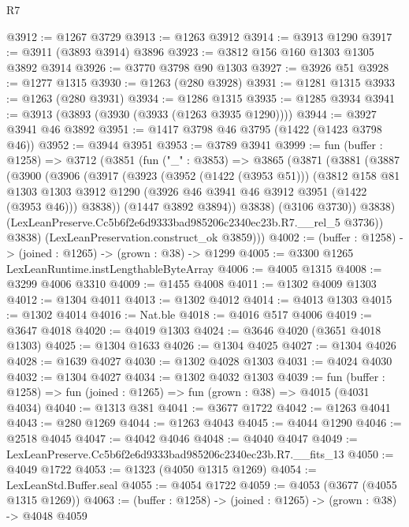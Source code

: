 \begin{lexlean}{R7}
\begin{coremodule}
@3912 := @1267 @3729
@3913 := @1263 @3912
@3914 := @3913 @1290
@3917 := @3911 (@3893 @3914) @3896
@3923 := @3812 @156 @160 @1303 @1305 @3892 @3914
@3926 := @3770 @3798 @90 @1303
@3927 := @3926 @51
@3928 := @1277 @1315
@3930 := @1263 (@280 @3928)
@3931 := @1281 @1315
@3933 := @1263 (@280 @3931)
@3934 := @1286 @1315
@3935 := @1285 @3934
@3941 := @3913 (@3893 (@3930 (@3933 (@1263 @3935 @1290))))
@3944 := @3927 @3941 @46 @3892
@3951 := @1417 @3798 @46 @3795 (@1422 (@1423 @3798 @46))
@3952 := @3944 @3951
@3953 := @3789 @3941
@3999 := fun (buffer : @1258) =>
  @3712
    (@3851
      (fun ("_" : @3853) =>
      @3865
        (@3871
          (@3881
            (@3887
              (@3900
                (@3906
                  (@3917
                    (@3923
                      (@3952 (@1422 (@3953 @51)))
                      (@3812
                        @158
                        @81
                        @1303
                        @1303
                        @3912
                        @1290
                        (@3926 @46 @3941 @46 @3912 @3951 (@1422 (@3953 @46)))
                        @3838))
                    (@1447 @3892 @3894))
                  @3838)
                (@3106 @3730))
              @3838)
            (LexLeanPreserve.Cc5b6f2e6d9333bad985206c2340ec23b.R7.__rel_5 @3736))
          @3838)
        (LexLeanPreservation.construct_ok @3859)))
@4002 := (buffer : @1258) -> (joined : @1265) -> (grown : @38) -> @1299
@4005 := @3300 @1265 LexLeanRuntime.instLengthableByteArray
@4006 := @4005 @1315
@4008 := @3299 @4006 @3310
@4009 := @1455 @4008
@4011 := @1302 @4009 @1303
@4012 := @1304 @4011
@4013 := @1302 @4012
@4014 := @4013 @1303
@4015 := @1302 @4014
@4016 := Nat.ble
@4018 := @4016 @517 @4006
@4019 := @3647 @4018
@4020 := @4019 @1303
@4024 := @3646 @4020 (@3651 @4018 @1303)
@4025 := @1304 @1633
@4026 := @1304 @4025
@4027 := @1304 @4026
@4028 := @1639 @4027
@4030 := @1302 @4028 @1303
@4031 := @4024 @4030
@4032 := @1304 @4027
@4034 := @1302 @4032 @1303
@4039 := fun (buffer : @1258) => fun (joined : @1265) => fun (grown : @38) => @4015 (@4031 @4034)
@4040 := @1313 @381
@4041 := @3677 @1722
@4042 := @1263 @4041
@4043 := @280 @1269
@4044 := @1263 @4043
@4045 := @4044 @1290
@4046 := @2518 @4045
@4047 := @4042 @4046
@4048 := @4040 @4047
@4049 := LexLeanPreserve.Cc5b6f2e6d9333bad985206c2340ec23b.R7.__fits_13
@4050 := @4049 @1722
@4053 := @1323 (@4050 @1315 @1269)
@4054 := LexLeanStd.Buffer.seal
@4055 := @4054 @1722
@4059 := @4053 (@3677 (@4055 @1315 @1269))
@4063 := (buffer : @1258) -> (joined : @1265) -> (grown : @38) -> @4048 @4059

\end{coremodule}
\end{lexlean}

